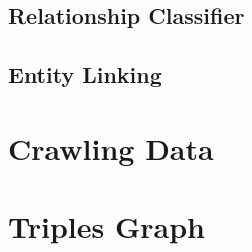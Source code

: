 \documentclass[11pt,a4paper]{article}
\begin{document}
\subsection{Relationship Classifier}
\label{subsec:rel_classifier}


\subsection{Entity Linking}
\label{subsec:ent_linking}


\section{Crawling Data}
\label{sec:crawl}


\section{Triples Graph}
\label{sec:triples_graph}

%
%
\end{document}
